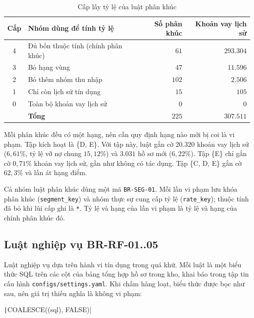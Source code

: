 \begin{table}[H]
	\centering
	\caption{Cấp lấy tỷ lệ của luật phân khúc}
	\label{tab:segment-fallback}
	\footnotesize
	\begin{tabular}{c p{} r r}
		\toprule
		\textbf{Cấp} & \textbf{Nhóm dùng để tính tỷ lệ}    & \textbf{Số phân khúc} & \textbf{Khoản vay lịch sử} \\
		\midrule
		4            & Đủ bốn thuộc tính (chính phân khúc) & $61$                  & $293.304$                  \\
		3            & Bỏ hạng vùng                        & $47$                  & $11.596$                   \\
		2            & Bỏ thêm nhóm thu nhập               & $102$                 & $2.506$                    \\
		1            & Chỉ còn lịch sử tín dụng            & $15$                  & $105$                      \\
		0            & Toàn bộ khoản vay lịch sử           & $0$                   & $0$                        \\
		\midrule
		             & \textbf{Tổng}                       & $225$                 & $307.511$                  \\
		\bottomrule
	\end{tabular}
\end{table}

Mỗi phân khúc đều có một hạng, nên cần quy định hạng nào mới bị coi là vi phạm. Tập kích hoạt là \{D, E\}. Với tập này, luật gắn cờ $20.320$ khoản vay lịch sử ($6{,}61\%$, tỷ lệ vỡ nợ chung $15{,}12\%$) và $3.031$ hồ sơ mới ($6{,}22\%$). Tập \{E\} chỉ gắn cờ $0{,}71\%$ khoản vay lịch sử, gần như không có tác dụng. Tập \{C, D, E\} gắn cờ $62{,}3\%$ và lấn át hạng điểm.

Cả nhóm luật phân khúc dùng một mã \texttt{BR-SEG-01}. Mỗi lần vi phạm lưu khóa phân khúc (\texttt{segment\_key}) và nhóm thực sự cung cấp tỷ lệ (\texttt{rate\_key}); thuộc tính đã bỏ khi lùi cấp ghi là \texttt{*}. Tỷ lệ và hạng của lần vi phạm là tỷ lệ và hạng của chính phân khúc đó.

\subsection{Luật nghiệp vụ BR-RF-01..05}
\label{sec:dss-business-rules}

Luật nghiệp vụ dựa trên hành vi tín dụng trong quá khứ. Mỗi luật là một biểu thức SQL trên các cột của bảng tổng hợp hồ sơ trong kho, khai báo trong tập tin cấu hình \texttt{configs/settings.yaml}. Khi chấm hàng loạt, biểu thức được bọc như sau, nên giá trị thiếu nghĩa là không vi phạm:
\begin{center}
	\texttt|COALESCE((sql), FALSE)|
\end{center}

